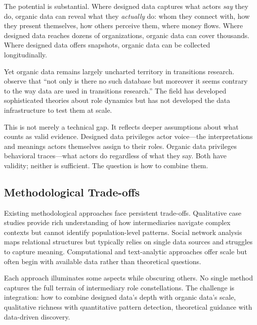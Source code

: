 \documentclass[../main.tex]{subfiles}
\begin{document}
The potential is substantial. Where designed data captures what actors \emph{say} they do, organic data can reveal what they \emph{actually} do: whom they connect with, how they present themselves, how others perceive them, where money flows. Where designed data reaches dozens of organizations, organic data can cover thousands. Where designed data offers snapshots, organic data can be collected longitudinally.

Yet organic data remains largely uncharted territory in transitions research. \textcite{dehaan2019datadriven} observe that ``not only is there no such database but moreover it seems contrary to the way data are used in transitions research.'' The field has developed sophisticated theories about role dynamics but has not developed the data infrastructure to test them at scale.

This is not merely a technical gap. It reflects deeper assumptions about what counts as valid evidence. Designed data privileges actor voice---the interpretations and meanings actors themselves assign to their roles. Organic data privileges behavioral traces---what actors do regardless of what they say. Both have validity; neither is sufficient. The question is how to combine them.

\subsection{Methodological Trade-offs}

Existing methodological approaches face persistent trade-offs. Qualitative case studies provide rich understanding of how intermediaries navigate complex contexts but cannot identify population-level patterns. Social network analysis maps relational structures but typically relies on single data sources and struggles to capture meaning. Computational and text-analytic approaches offer scale but often begin with available data rather than theoretical questions.

Each approach illuminates some aspects while obscuring others. No single method captures the full terrain of intermediary role constellations. The challenge is integration: how to combine designed data's depth with organic data's scale, qualitative richness with quantitative pattern detection, theoretical guidance with data-driven discovery.


\end{document}
